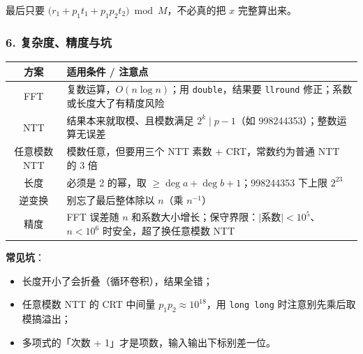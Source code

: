 最后只要 $\bigl(r_1+p_1t_1+p_1p_2t_2\bigr)\bmod M$，不必真的把 $x$ 完整算出来。

\subsubsection*{6. 复杂度、精度与坑}

\begin{center}
\begin{tabular}{|c|p{9.6cm}|}
\hline
\textbf{方案} & \textbf{适用条件 / 注意点} \\
\hline
FFT & 复数运算，$O(n\log n)$；用 \texttt{double}，结果要 \texttt{llround} 修正；系数或长度大了有精度风险 \\
\hline
NTT & 结果本来就取模、且模数满足 $2^k\mid p-1$（如 998244353）；整数运算无误差 \\
\hline
任意模数 NTT & 模数任意，但要用三个 NTT 素数 + CRT，常数约为普通 NTT 的 3 倍 \\
\hline
长度 & 必须是 2 的幂，取 $\ge \deg a+\deg b+1$；998244353 下上限 $2^{23}$ \\
\hline
逆变换 & 别忘了最后整体除以 $n$（乘 $n^{-1}$） \\
\hline
精度 & FFT 误差随 $n$ 和系数大小增长；保守界限：$|$系数$|<10^5$、$n<10^6$ 时安全，超了换任意模数 NTT \\
\hline
\end{tabular}
\end{center}

\textbf{常见坑}：

\begin{itemize}
    \item 长度开小了会折叠（循环卷积），结果全错；
    \item 任意模数 NTT 的 CRT 中间量 $p_1p_2\approx10^{18}$，用 \texttt{long long} 时注意别先乘后取模搞溢出；
    \item 多项式的「次数 + 1」才是项数，输入输出下标别差一位。
\end{itemize}
